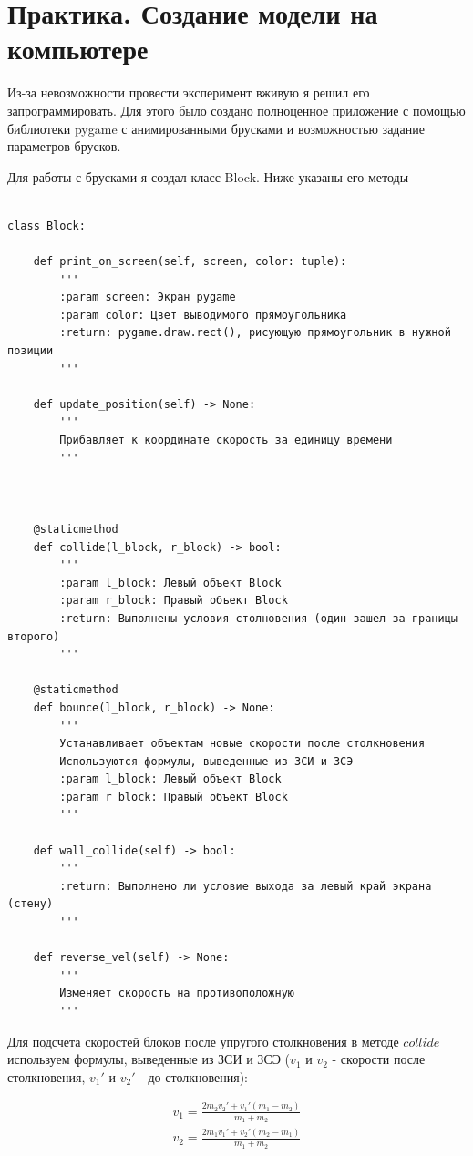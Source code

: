 \documentclass[a4paper,12pt]{article} %
\begin{document}
\section*{Практика. Создание модели на компьютере}
Из-за невозможности провести эксперимент вживую я решил его запрограммировать. Для этого было создано полноценное приложение с помощью библиотеки pygame с анимированными брусками и возможностью задание параметров брусков.

Для работы с брусками я создал класс Block. Ниже указаны его методы

\begin{verbatim}

class Block:

    def print_on_screen(self, screen, color: tuple):
        '''
        :param screen: Экран pygame
        :param color: Цвет выводимого прямоугольника
        :return: pygame.draw.rect(), рисующую прямоугольник в нужной позиции
        '''

    def update_position(self) -> None:
        '''
        Прибавляет к координате скорость за единицу времени
        '''



    @staticmethod
    def collide(l_block, r_block) -> bool:
        '''
        :param l_block: Левый объект Block
        :param r_block: Правый объект Block
        :return: Выполнены условия столновения (один зашел за границы второго)
        '''

    @staticmethod
    def bounce(l_block, r_block) -> None:
        '''
        Устанавливает объектам новые скорости после столкновения
        Используются формулы, выведенные из ЗСИ и ЗСЭ
        :param l_block: Левый объект Block
        :param r_block: Правый объект Block
        '''
        
    def wall_collide(self) -> bool:
        '''
        :return: Выполнено ли условие выхода за левый край экрана (стену)
        '''
        
    def reverse_vel(self) -> None:
        '''
        Изменяет скорость на противоположную
        '''
\end{verbatim}

Для подсчета скоростей блоков после упругого столкновения в методе $collide$ используем формулы, выведенные из ЗСИ и ЗСЭ ($v_1$ и $v_2$ - скорости после столкновения, $v_1'$ и $v_2'$ - до столкновения):

\[
\begin{matrix}
    v_1 = \frac{2m_2v_2' + v_1'(m_1-m_2)}{m_1+m_2}
    \\
    v_2 = \frac{2m_1v_1' + v_2'(m_2-m_1)}{m_1+m_2}
\end{matrix}
\]
\end{document}
